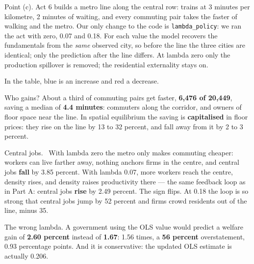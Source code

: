 \begin{say}
 Point (c). Act 6 builds a metro line along the central row: trains at 3 minutes per kilometre, 2 minutes of waiting, and every commuting pair takes the faster of walking and the metro. Our only change to the code is \texttt{lambda\_policy}: we ran the act with zero, 0.07 and 0.18. For each value the model recovers the fundamentals from the \emph{same} observed city, so before the line the three cities are identical; only the prediction after the line differs.  At lambda zero only the production spillover is removed; the residential externality stays on.

 In the table, blue is an increase and red a decrease.

 Who gains? About a third of commuting pairs get faster, \textbf{6,476 of 20,449}, saving a median of \textbf{4.4 minutes}: commuters along the corridor, and owners of floor space near the line. In spatial equilibrium the saving is \textbf{capitalised} in floor prices: they rise on the line by 13 to 32 percent, and fall away from it by 2 to 3 percent.

 Central jobs. \pause\ With lambda zero the metro only makes commuting cheaper: workers can live farther away, nothing anchors firms in the centre, and central jobs \textbf{fall} by 3.85 percent. With lambda 0.07, more workers reach the centre, density rises, and density raises productivity there --- the same feedback loop as in Part A: central jobs \textbf{rise} by 2.49 percent. The sign flips. At 0.18 the loop is so strong that central jobs jump by 52 percent and firms crowd residents out of the line, minus 35.

 The wrong lambda. A government using the OLS value would predict a welfare gain of \textbf{2.60 percent} instead of \textbf{1.67}: 1.56 times, a \textbf{56 percent} overstatement, 0.93 percentage points. And it is conservative: the updated OLS estimate is actually 0.206.
\end{say}

